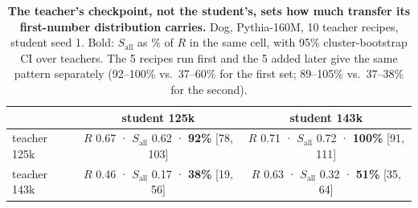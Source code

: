 \begin{table}[t]
\centering
\small
\begin{tabular}{lcc}
\toprule
& student 125k & student 143k \\
\midrule
teacher 125k & $R$ 0.67 · $S_{\mathrm{all}}$ 0.62 · \textbf{92\%} [78, 103] & $R$ 0.71 · $S_{\mathrm{all}}$ 0.72 · \textbf{100\%} [91, 111] \\
teacher 143k & $R$ 0.46 · $S_{\mathrm{all}}$ 0.17 · \textbf{38\%} [19, 56] & $R$ 0.63 · $S_{\mathrm{all}}$ 0.32 · \textbf{51\%} [35, 64] \\
\bottomrule
\end{tabular}
\caption{\textbf{The teacher's checkpoint, not the student's, sets how much transfer its first-number distribution carries.}
Dog, Pythia-160M, 10 teacher recipes, student seed 1. Bold: $S_{\mathrm{all}}$ as \% of $R$ in the same cell, with 95\% cluster-bootstrap CI over teachers. The 5 recipes run first and the 5 added later give the same pattern separately (92--100\% vs.\ 37--60\% for the first set; 89--105\% vs.\ 37--38\% for the second).}
\label{tab:resampling-2x2}
\end{table}
